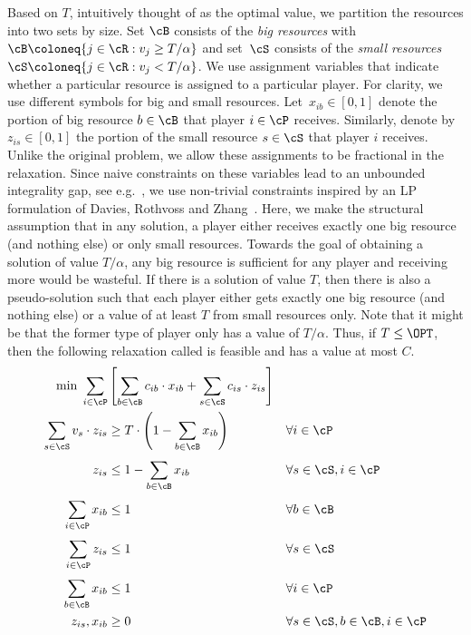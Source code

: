 \documentclass[a4paper,USenglish,cleveref,thm-restate]{lipics-v2021}
\begin{document}
Based on $T$, intuitively thought of as the optimal value, we partition the resources into two sets by size. Set $\cB$ consists of the \emph{big resources} with $\cB \coloneq \{ j \in \cR : v_j \geq T/\alpha\}$ and set~$\cS$ consists of the \emph{small resources} $\cS \coloneq \{ j \in \cR : v_j < T/\alpha\}$.
We use assignment variables that indicate whether a particular
resource is assigned to a particular player. For clarity,
we use different symbols for big and small resources.
Let~$x_{ib} \in [0,1]$ denote the portion of big resource $b \in \cB$ that player $i \in  \cP$ receives. Similarly, denote by $z_{is} \in [0,1]$ the portion of the small resource $s \in \cS$ that player $i$ receives.
Unlike the original problem, we allow these
assignments to be fractional in the relaxation.
Since naive constraints on these variables lead to an unbounded integrality gap, see e.g.~\cite{BansalS06}, we use
non-trivial constraints inspired by an LP formulation of Davies, Rothvoss and Zhang~\cite{DaviesRZ20}. Here, we make the structural
assumption that in any solution, a player either receives exactly
one big resource (and nothing else) or only small resources.
Towards the goal of obtaining a solution of value $T/\alpha$,
any big resource is sufficient for any player and receiving more
would be wasteful.
If there is a solution of value $T$, then there is also
a pseudo-solution such that each player either gets exactly one big
resource (and nothing else) or a value of at least $T$ from
small resources only. Note that it might be that the former
type of player only has a value of $T/\alpha$. Thus, if $T \le \OPT$, then the following relaxation called 
is feasible and has a value at most $C$.
\begin{align}
    \min \; \sum_{i \in \cP}^{} &\left[\sum_{b \in \cB}^{}c_{ib}\cdot x_{ib} + \sum_{s \in \cS}^{}c_{is}\cdot z_{is} \right]  && \label{eq:economical-objective-function} \\
    \sum_{s \in \cS} v_{s}\cdot z_{is} &\geq T \cdot \left(1 - \sum_{b \in \cB} x_{ib}\right) &&\forall i \in \cP \label{eq:economical-value} \\
    z_{is} &\leq 1 - \sum_{b \in \cB}^{} x_{ib} &&\forall s \in \cS, i \in \cP \label{eq:economical-small-gifts} \\
    \sum_{i \in \cP}^{} x_{ib} &\leq 1 &&\forall b \in \cB \label{eq:economical-ub-player} \\
    \sum_{i \in \cP}^{} z_{is} &\leq 1 &&\forall s \in \cS \label{eq:economical-ub-z} \\
    \sum_{b \in \cB}^{} x_{ib} &\leq 1 &&\forall i \in \cP \label{eq:economical-ub-big-gifts} \\
    z_{is}, x_{ib}  &\geq 0 &&\forall s \in \cS, b \in \cB, i \in \cP \label{eq:economical-nonneg-x}
\end{align}
\end{document}
